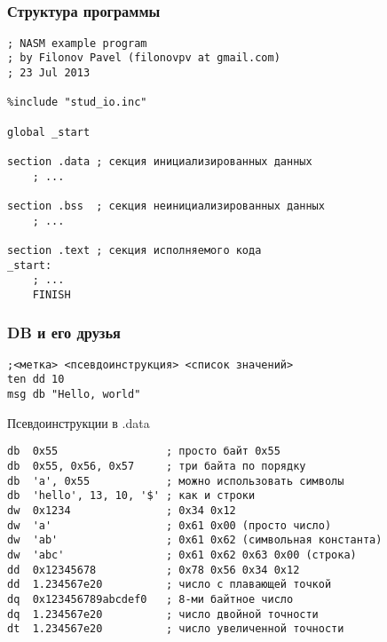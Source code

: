 \documentclass{beamer}
\begin{document}
    \subsection{}
    \begin{frame}[fragile]
        \frametitle{Структура программы}\small
        \begin{verbatim}
; NASM example program
; by Filonov Pavel (filonovpv at gmail.com)
; 23 Jul 2013

%include "stud_io.inc"

global _start

section .data ; секция инициализированных данных
    ; ...

section .bss  ; секция неинициализированных данных 
    ; ...

section .text ; секция исполняемого кода
_start:
    ; ...
    FINISH
        \end{verbatim}
\end{frame}
    \begin{frame}[fragile]
        \frametitle{DB и его друзья}\small
        \begin{verbatim}
;<метка> <псевдоинструкция> <список значений> 
ten dd 10 
msg db "Hello, world"\end{verbatim}
        \begin{block}{Псевдоинструкции в .data}\small
            \begin{verbatim}
db  0x55                 ; просто байт 0x55
db  0x55, 0x56, 0x57     ; три байта по порядку
db  'a', 0x55            ; можно использовать символы
db  'hello', 13, 10, '$' ; как и строки
dw  0x1234               ; 0x34 0x12
dw  'a'                  ; 0x61 0x00 (просто число)
dw  'ab'                 ; 0x61 0x62 (символьная константа)
dw  'abc'                ; 0x61 0x62 0x63 0x00 (строка)
dd  0x12345678           ; 0x78 0x56 0x34 0x12
dd  1.234567e20          ; число с плавающей точкой
dq  0x123456789abcdef0   ; 8-ми байтное число
dq  1.234567e20          ; число двойной точности
dt  1.234567e20          ; число увеличенной точности
            \end{verbatim}
        \end{block}
\end{frame}
\end{document}

